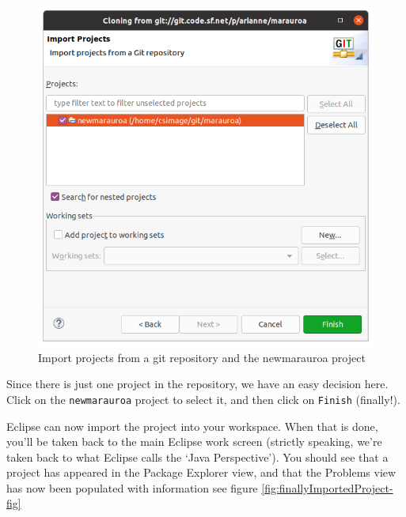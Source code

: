 \documentclass[
]{book}
\begin{document}
\begin{figure}

{\centering \includegraphics[width=1\linewidth]{images/1.4eclipseSelectProjectsToImport} 

}

\caption{Import projects from a git repository and the newmarauroa project}\label{fig:eclipseSelectProjectsToImport-fig}
\end{figure}

Since there is just one project in the repository, we have an easy decision here. Click on the \texttt{newmarauroa} project to select it, and then click on \texttt{Finish} (finally!).

Eclipse can now import the project into your workspace. When that is done, you'll be taken back to the main Eclipse work screen (strictly speaking, we're taken back to what Eclipse calls the `Java Perspective'). You should see that a project has appeared in the Package Explorer view, and that the Problems view has now been populated with information see figure \ref{fig:finallyImportedProject-fig}
\end{document}
